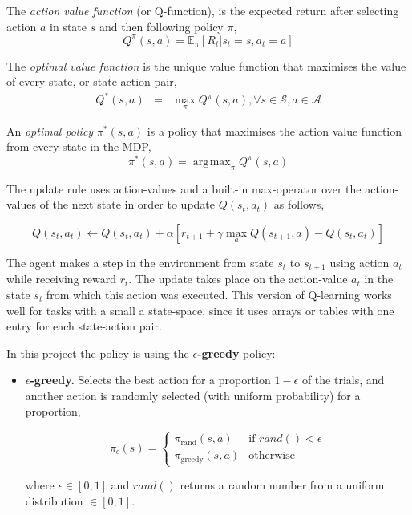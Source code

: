 \documentclass[a4paper]{article}
\DeclareMathOperator*{\argmax}{\arg\!\max}
\begin{document}
The \emph{action value function} (or Q-function), is the expected return after selecting action $a$ in state $s$ and then following policy $\pi$,
%
\begin{equation}
Q^\pi(s,a) = \mathbb{E}_\pi \left[ R_t | s_t = s, a_t = a \right]
\end{equation}

The \emph{optimal value function} is the unique value function that maximises the value of every state, or state-action pair,
%
\begin{eqnarray}
Q^*(s,a) & = & \max\limits_\pi Q^\pi(s,a), \forall s \in \mathcal{S}, a \in \mathcal{A}
\end{eqnarray}

An \emph{optimal policy} $\pi^*(s,a)$ is a policy that maximises the action value function from every state in the MDP,
%
\begin{equation}
    \pi^*(s,a) = \argmax_\pi Q^\pi(s, a)
\end{equation}

The update rule uses action-values and a built-in max-operator over the action-values of the next state in order to update $Q(s_t, a_t)$ as follows,

\begin{equation}
Q(s_t,a_t) \gets Q(s_t,a_t) + \alpha \left[r_{t+1} + \gamma \max_a Q(s_{t+1},a) - Q(s_t,a_t)\right]
\end{equation}

The agent makes a step in the environment from state $s_t$ to $s_{t+1}$ using action $a_t$ while receiving reward $r_t$. The update takes place on the action-value $a_t$ in the state $s_t$ from which this action was executed. This version of Q-learning works well for tasks with a small a state-space, since it uses arrays or tables with one entry for each state-action pair.

In this project the policy is using the \textbf{$\epsilon$-greedy} policy:

\begin{itemize}

    \item \textbf{$\epsilon$-greedy.} Selects the best action for a proportion
        $1 - \epsilon$ of the trials, and another action is randomly selected (with
        uniform probability) for a proportion,
        
        \begin{equation}
            \pi_{\epsilon}(s) = \left\{
             \begin{array}{lr}
                 \pi_{\textrm{rand}}(s,a) & \text{if } rand() < \epsilon\\
                 \pi_{\textrm{greedy}}(s,a) & \text{otherwise}
             \end{array}
           \right.
        \end{equation}

        where $\epsilon \in [0, 1]$ and $rand()$ returns a random number from a uniform distribution $\in [0, 1]$.

\end{itemize}
\end{document}

